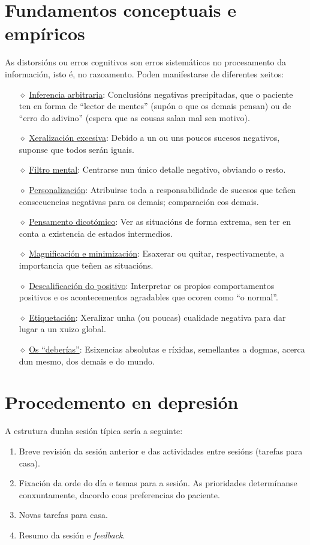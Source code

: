 \documentclass[a4paper,11pt]{article}
\begin{document}
\section{Fundamentos conceptuais e empíricos}
As distorsións ou erros cognitivos son erros sistemáticos no procesamento da información, isto é, no razoamento. Poden manifestarse de diferentes xeitos:
\begin{itemize}
	\item[$\diamond$] \underline{Inferencia arbitraria}: Conclusións negativas precipitadas, que o 
	paciente ten en forma de ``lector de mentes'' (supón o que os demais pensan) ou de ``erro do 
	adivino'' (espera que as cousas salan mal sen motivo).
	\item[$\diamond$] \underline{Xeralización excesiva}: Debido a un ou uns poucos sucesos negativos, 
	suponse que todos serán iguais.
	\item[$\diamond$] \underline{Filtro mental}: Centrarse nun único detalle negativo, obviando o 
	resto.
	\item[$\diamond$] \underline{Personalización}: Atribuirse toda a responsabilidade de sucesos que 
	teñen consecuencias negativas para os demais; comparación cos demais.
	\item[$\diamond$] \underline{Pensamento dicotómico}: Ver as situacións de forma extrema, sen ter 
	en conta a existencia de estados intermedios.
	\item[$\diamond$] \underline{Magnificación e minimización}: Esaxerar ou quitar, respectivamente, 
	a importancia que teñen as situacións.
	\item[$\diamond$] \underline{Descalificación do positivo}: Interpretar os propios comportamentos 
	positivos e os acontecementos agradables que ocoren como ``o normal''.
	\item[$\diamond$] \underline{Etiquetación}: Xeralizar unha (ou poucas) cualidade negativa para 
	dar lugar a un xuizo global.
	\item[$\diamond$] \underline{Os ``deberías''}: Esixencias absolutas e ríxidas, semellantes a 
	dogmas, acerca dun mesmo, dos demais e do mundo. 
\end{itemize}

\section{Procedemento en depresión}
A estrutura dunha sesión típica sería a seguinte:
\begin{enumerate}
	\item Breve revisión da sesión anterior e das actividades entre sesións (tarefas para casa).
	\item Fixación da orde do día e temas para a sesión. As prioridades determínanse conxuntamente, 
	dacordo coas preferencias do paciente.
	\item Novas tarefas para casa.
	\item Resumo da sesión e \textit{feedback}. 
\end{enumerate}
\end{document}

